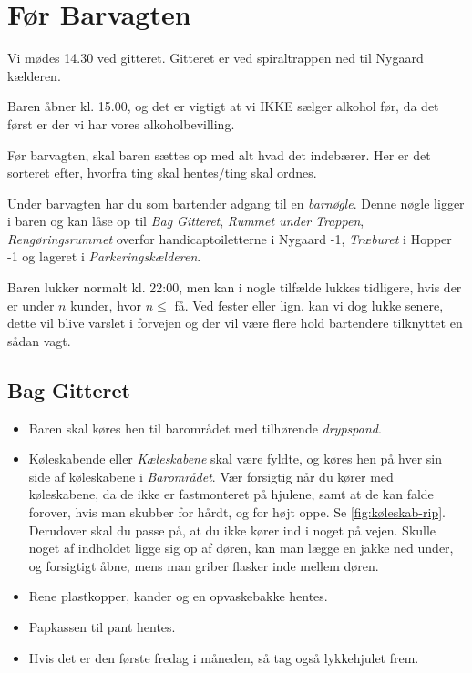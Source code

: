 \section{Før Barvagten}
\label{sec:pre-barvagten}

Vi mødes 14.30 ved gitteret. Gitteret er ved spiraltrappen ned til Nygaard kælderen.

Baren åbner kl. 15.00, og det er vigtigt
at vi IKKE sælger alkohol før, da det først er der vi har vores alkoholbevilling.

Før barvagten, skal baren sættes op med alt hvad det indebærer. Her er
det sorteret efter, hvorfra ting skal hentes/ting skal ordnes.

Under barvagten har du som bartender adgang til en \textit{barnøgle}.
Denne nøgle ligger i baren og kan låse op til \textit{Bag Gitteret},
\textit{Rummet under Trappen}, 
\textit{Rengøringsrummet} overfor handicaptoiletterne i Nygaard -1,
\textit{Træburet} i Hopper -1
og lageret i \textit{Parkeringskælderen}.

Baren lukker normalt kl. 22:00, men kan i nogle tilfælde lukkes tidligere, hvis der er under
$n$ kunder, hvor $n \le$ få. 
Ved fester eller lign. kan vi dog lukke senere, dette vil blive varslet i forvejen og der vil
være flere hold bartendere tilknyttet en sådan vagt.

\subsection{Bag Gitteret}
\label{sec:pre:bag-ved-gitteret}

\begin{itemize}
	\item Baren skal køres hen til barområdet med tilhørende \textit{drypspand}.
	\item Køleskabende eller \textit{Kæleskabene} skal være fyldte, og køres hen på hver sin side af køleskabene i
	\textit{Barområdet}. Vær forsigtig når du kører med køleskabene, da de ikke er fastmonteret på hjulene,
	samt at de kan falde forover, hvis man skubber for hårdt, og for højt oppe. Se \autoref{fig:køleskab-rip}. Derudover skal
	du passe på, at du ikke kører ind i noget på vejen. Skulle noget af indholdet ligge sig op af døren, kan man lægge en jakke
	ned under, og forsigtigt åbne, mens man griber flasker inde mellem døren.
	\item Rene plastkopper, kander og en opvaskebakke hentes.
	\item Papkassen til pant hentes.
	\item Hvis det er den første fredag i måneden, så tag også lykkehjulet frem.
\end{itemize}

